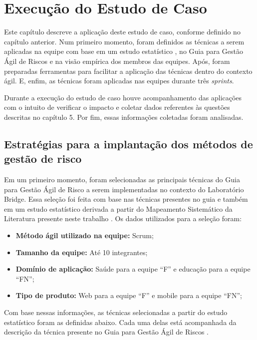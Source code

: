 \documentclass[
    12pt,       %
    openright,      %
    twoside,      %
    a4paper,      %
    english,      %
    french,       %
    spanish,      %
    brazil,       %
    ]{abntex2}
\begin{document}
\chapter{Execução do Estudo de Caso}
\label{sec:Experimentos}

Este capítulo descreve a aplicação deste estudo de caso, conforme definido no capítulo anterior. Num primeiro momento, foram definidos as técnicas a serem aplicadas na equipe com base em um estudo estatístico \cite{GARCIA:2022}, no Guia para Gestão Ágil de Riscos e na visão empírica dos membros das equipes. Após, foram preparadas ferramentas para facilitar a aplicação das técnicas dentro do contexto ágil. E, enfim, as técnicas foram aplicadas nas equipes durante três \textit{sprints}.

Durante a execução do estudo de caso houve acompanhamento das aplicações com o intuito de verificar o impacto e coletar dados referentes às questões descritas no capítulo 5. Por fim, essas informações coletadas foram analisadas.

\section{Estratégias para a implantação dos métodos de gestão de risco}

Em um primeiro momento, foram selecionadas as principais técnicas do Guia para Gestão Ágil de Risco a serem implementadas no contexto do Laboratório Bridge. Essa seleção foi feita com base nas técnicas presentes no guia e também em um estudo estatístico derivada a partir do Mapeamento Sistemático da Literatura presente neste trabalho \cite{GARCIA:2022}. Os dados utilizados para a seleção foram:

\begin{itemize}
    \item \textbf{Método ágil utilizado na equipe:} Scrum;
    \item \textbf{Tamanho da equipe:} Até 10 integrantes;
    \item \textbf{Domínio de aplicação:} Saúde para a equipe ``F'' e educação para a equipe ``FN'';
    \item \textbf{Tipo de produto:} Web para a equipe ``F'' e mobile para a equipe ``FN'';
\end{itemize}

Com base nessas informações, as técnicas selecionadas a partir do estudo estatístico foram as definidas abaixo. Cada uma delas está acompanhada da descrição da técnica presente no Guia para Gestão Ágil de Riscos \cite{Vieira:2020}.
\end{document}
